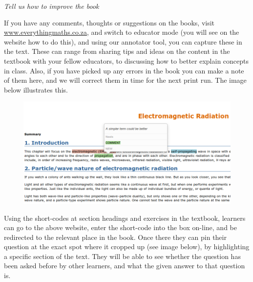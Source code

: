 \pagebreak
{\normalfont\sffamily\fontsize{22}\normalfont\itshape Tell us how to improve the book} \par

{\Large
If you have any comments, thoughts or suggestions on the books, visit \underline{www.everythingmaths.co.za}, and
switch to educator mode (you will see on the website how to do this), and using our annotator tool, you can
capture these in the text. These can range from sharing tips and ideas on the content in the textbook with
your fellow educators, to discussing how to better explain concepts in class. Also, if you have picked up any
errors in the book you can make a note of them here, and we will correct them in time for the next print run.
The image below illustrates this.
 \par


\begin{figure}[H]
\centering
\includegraphics[width=\textwidth]{../title_images/annotater.png}
\end{figure}

Using the short-codes at section headings and exercises in the textbook, learners can go to the above website, enter the short-code into the box on-line, and be redirected to the relevant place in the book. Once there they can pin their question at the exact spot where it cropped up (see image below), by highlighting a specific section of the text. They will be able to see whether the question has been asked before by other learners, and what the given answer to that question is. \par
}
% 
% 
% 
% 


